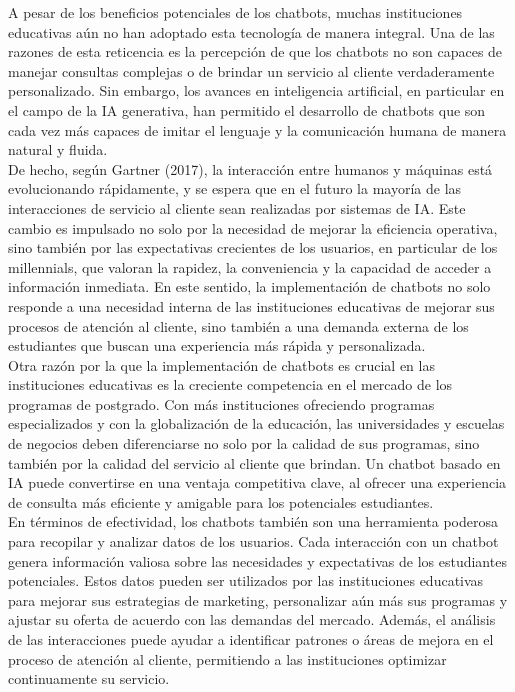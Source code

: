 \documentclass[10pt,a4paper]{article}
\begin{document}
A pesar de los beneficios potenciales de los chatbots, muchas instituciones educativas aún no han adoptado esta tecnología de manera integral. Una de las razones de esta reticencia es la percepción de que los chatbots no son capaces de manejar consultas complejas o de brindar un servicio al cliente verdaderamente personalizado. Sin embargo, los avances en inteligencia artificial, en particular en el campo de la IA generativa, han permitido el desarrollo de chatbots que son cada vez más capaces de imitar el lenguaje y la comunicación humana de manera natural y fluida.\\

De hecho, según Gartner (2017), la interacción entre humanos y máquinas está evolucionando rápidamente, y se espera que en el futuro la mayoría de las interacciones de servicio al cliente sean realizadas por sistemas de IA. Este cambio es impulsado no solo por la necesidad de mejorar la eficiencia operativa, sino también por las expectativas crecientes de los usuarios, en particular de los millennials, que valoran la rapidez, la conveniencia y la capacidad de acceder a información inmediata. En este sentido, la implementación de chatbots no solo responde a una necesidad interna de las instituciones educativas de mejorar sus procesos de atención al cliente, sino también a una demanda externa de los estudiantes que buscan una experiencia más rápida y personalizada.\\

Otra razón por la que la implementación de chatbots es crucial en las instituciones educativas es la creciente competencia en el mercado de los programas de postgrado. Con más instituciones ofreciendo programas especializados y con la globalización de la educación, las universidades y escuelas de negocios deben diferenciarse no solo por la calidad de sus programas, sino también por la calidad del servicio al cliente que brindan. Un chatbot basado en IA puede convertirse en una ventaja competitiva clave, al ofrecer una experiencia de consulta más eficiente y amigable para los potenciales estudiantes.\\

En términos de efectividad, los chatbots también son una herramienta poderosa para recopilar y analizar datos de los usuarios. Cada interacción con un chatbot genera información valiosa sobre las necesidades y expectativas de los estudiantes potenciales. Estos datos pueden ser utilizados por las instituciones educativas para mejorar sus estrategias de marketing, personalizar aún más sus programas y ajustar su oferta de acuerdo con las demandas del mercado. Además, el análisis de las interacciones puede ayudar a identificar patrones o áreas de mejora en el proceso de atención al cliente, permitiendo a las instituciones optimizar continuamente su servicio.\\
\end{document}
